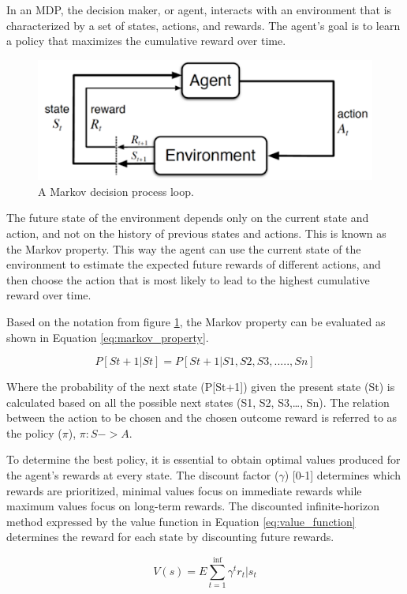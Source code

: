 In an MDP, the decision maker, or agent, interacts with an environment that is characterized by a set of states, actions, and rewards. The agent's goal is to learn a policy that maximizes the cumulative reward over time.

\begin{figure}[!htp]
    \centering
    \includegraphics[width=.6\textwidth]{fig/rl/MDP-model.png}
    \caption{A Markov decision process loop.}
    \label{fig:MDP}
\end{figure}

The future state of the environment depends only on the current state and action, and not on the history of previous states and actions. This is known as the Markov property. This way the agent can use the current state of the environment to estimate the expected future rewards of different actions, and then choose the action that is most likely to lead to the highest cumulative reward over time.

Based on the notation from figure \ref{fig:MDP}, the Markov property can be evaluated as shown in Equation \ref{eq:markov_property}.

\begin{equation}
    \label{eq:markov_property}
    P[St+1|St] = P[St+1|S1,S2,S3,.....,Sn]
\end{equation}

Where the probability of the next state (P[St+1]) given the present state (St) is calculated based on all the possible next states (S1, S2, S3,\dots, Sn).
The relation between the action to be chosen and the chosen outcome reward is referred to as the policy ($\pi$), $\pi: S -> A$.

To determine the best policy, it is essential to obtain optimal values produced for the agent's rewards at every state. The discount factor ($\gamma$) [0-1] determines which rewards are prioritized, minimal values focus on immediate rewards while maximum values focus on long-term rewards. The discounted infinite-horizon method expressed by the value function in Equation \ref{eq:value_function} determines the reward for each state by discounting future rewards.

\begin{equation}
    \label{eq:value_function}
    V(s) = E \sum_{t=1}^{\inf}\gamma^t r_t|s_t
\end{equation}

